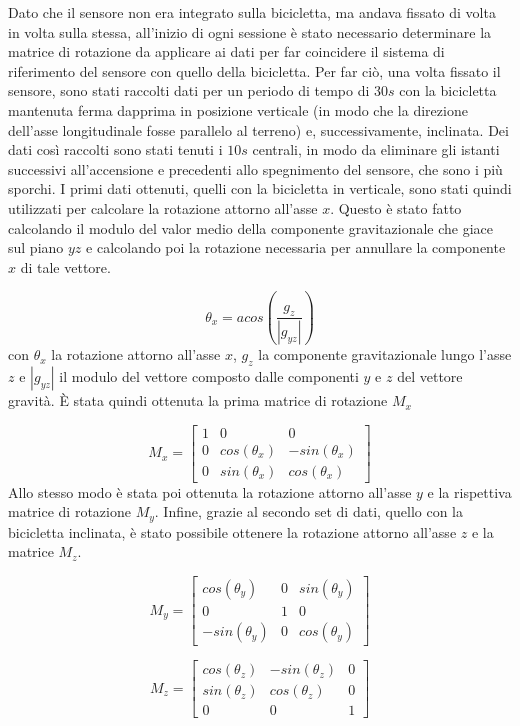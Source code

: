 \documentclass[class=article]{standalone}
\begin{document}
	Dato che il sensore non era integrato sulla bicicletta, ma andava fissato di volta in volta sulla stessa, all'inizio di ogni sessione è stato necessario determinare la matrice di rotazione da applicare ai dati per far coincidere il sistema di riferimento del sensore con quello della bicicletta. Per far ciò, una volta fissato il sensore, sono stati raccolti dati per un periodo di tempo di \(30s\) con la bicicletta mantenuta ferma dapprima in posizione verticale (in modo che la direzione dell'asse longitudinale fosse parallelo al terreno) e, successivamente, inclinata. Dei dati così raccolti sono stati tenuti i \(10s\) centrali, in modo da eliminare gli istanti successivi all'accensione e precedenti allo spegnimento del sensore, che sono i più sporchi. I primi dati ottenuti, quelli con la bicicletta in verticale, sono stati quindi utilizzati per calcolare la rotazione attorno all'asse \(x\). Questo è stato fatto calcolando il modulo del valor medio della componente gravitazionale che giace sul piano \(yz\) e calcolando poi la rotazione necessaria per annullare la componente \(x\) di tale vettore.
	
	\[\theta_{x}=acos\left(\frac{g_{z}}{|g_{yz}|}\right)\]
	con \(\theta_{x}\) la rotazione attorno all'asse \(x\), \(g_{z}\) la componente gravitazionale lungo l'asse \(z\) e \(|g_{yz}|\) il modulo del vettore composto dalle componenti \(y\) e \(z\) del vettore gravità. È stata quindi ottenuta la prima matrice di rotazione \(M_{x}\)
	
	\[M_{x}= \begin{bmatrix}
		1 & 0 & 0 \\
		0 & cos(\theta_{x}) & -sin(\theta_{x}) \\
		0 & sin(\theta_{x}) & cos(\theta_{x})
	\end{bmatrix}\]
	Allo stesso modo è stata poi ottenuta la rotazione attorno all'asse \(y\) e la rispettiva matrice di rotazione \(M_{y}\). Infine, grazie al secondo set di dati, quello con la bicicletta inclinata, è stato possibile ottenere la rotazione attorno all'asse \(z\) e la matrice \(M_{z}\).
	
	\[M_{y}=\begin{bmatrix}
		cos(\theta_{y}) & 0 & sin(\theta_{y}) \\
		0 & 1 & 0 \\
		-sin(\theta_{y}) & 0 & cos(\theta_{y})
	\end{bmatrix}\]
	
	\[M_{z}=\begin{bmatrix}
		cos(\theta_{z}) & -sin(\theta_{z}) & 0 \\
		sin(\theta_{z}) & cos(\theta_{z}) & 0 \\
		0 & 0 & 1
	\end{bmatrix}\]
	
\end{document}
